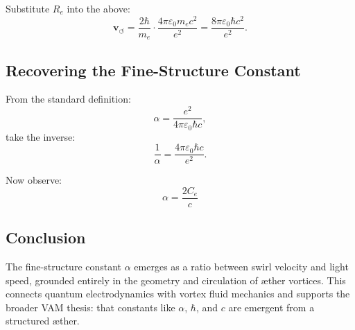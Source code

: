 Substitute \( R_e \) into the above:
\begin{equation}
    \mathbf{v}_{\scriptscriptstyle\boldsymbol{\circlearrowleft}} = \frac{2\hbar}{m_e} \cdot \frac{4\pi \varepsilon_0 m_e c^2}{e^2} = \frac{8\pi \varepsilon_0 \hbar c^2}{e^2}.
\end{equation}

\subsection{Recovering the Fine-Structure Constant}

From the standard definition:
\begin{equation}
    \alpha = \frac{e^2}{4\pi \varepsilon_0 \hbar c},
\end{equation}
take the inverse:
\begin{equation}
    \frac{1}{\alpha} = \frac{4\pi \varepsilon_0 \hbar c}{e^2}.
\end{equation}

Now observe:
\begin{equation}
    \boxed{
        \alpha = \frac{2 C_e}{c}
    }
\end{equation}

\subsection*{Conclusion}

The fine-structure constant \( \alpha \) emerges as a ratio between swirl velocity and light speed, grounded entirely in the geometry and circulation of æther vortices. This connects quantum electrodynamics with vortex fluid mechanics and supports the broader VAM thesis: that constants like \( \alpha \), \( \hbar \), and \( c \) are emergent from a structured æther.